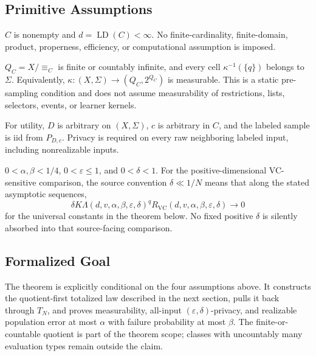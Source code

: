 \subsection{Primitive Assumptions}
\begin{assumption}\label{assump:finite-littlestone}
$C$ is nonempty and $d=\operatorname{LD}(C)<\infty$.  No finite-cardinality,
finite-domain, product, properness, efficiency, or computational assumption
is imposed.
\end{assumption}

\begin{assumption}\label{assump:countable-evaluation-quotient}
$Q_C=X/{\equiv_C}$ is finite or countably infinite, and every cell
$\kappa^{-1}(\{q\})$ belongs to $\Sigma$.  Equivalently,
$\kappa:(X,\Sigma)\to(Q_C,2^{Q_C})$ is measurable.  This is a static
pre-sampling condition and does not assume measurability of restrictions,
lists, selectors, events, or learner kernels.
\end{assumption}

\begin{assumption}\label{assump:realizable-iid}
For utility, $D$ is arbitrary on $(X,\Sigma)$, $c$ is arbitrary in $C$,
and the labeled sample is iid from $P_{D,c}$.  Privacy is required on every
raw neighboring labeled input, including nonrealizable inputs.
\end{assumption}

\begin{assumption}\label{assump:approximate-dp-regime}
$0<\alpha,\beta<1/4$, $0<\varepsilon\le1$, and $0<\delta<1$.  For the
positive-dimensional VC-sensitive comparison, the source convention
$\delta\ll1/N$ means that along the stated asymptotic sequences,
\[
 \delta K\Lambda(d,v,\alpha,\beta,\varepsilon,\delta)^q
 R_{\mathrm{VC}}(d,v,\alpha,\beta,\varepsilon,\delta)\longrightarrow0
\]
for the universal constants in the theorem below.  No fixed positive
$\delta$ is silently absorbed into that source-facing comparison.
\end{assumption}

\subsection{Formalized Goal}
The theorem is explicitly conditional on the four assumptions above.  It
constructs the quotient-first totalized law described in the next section,
pulls it back through $T_N$, and proves measurability, all-input
$(\varepsilon,\delta)$-privacy, and realizable population error at most
$\alpha$ with failure probability at most $\beta$.  The finite-or-countable
quotient is part of the theorem scope; classes with uncountably many
evaluation types remain outside the claim.

